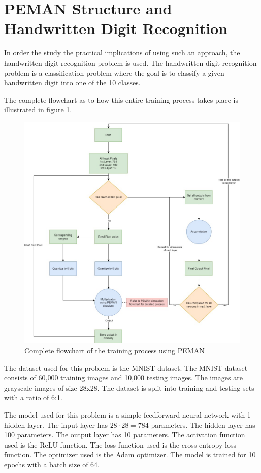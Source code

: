 \section{PEMAN Structure and Handwritten Digit Recognition}

In order the study the practical implications of using such an approach, the handwritten digit recognition problem is used. The handwritten digit recognition problem is a classification problem where the goal is to classify a given handwritten digit into one of the 10 classes.

The complete flowchart as to how this entire training process takes place is illustrated in figure \ref{compFLowchart}.

\begin{figure}
	\centering
	\includegraphics[width=\textwidth]{images/compFLowchart.png}
	\caption{Complete flowchart of the training process using PEMAN}
	\label{compFLowchart}
\end{figure}

The dataset used for this problem is the MNIST dataset. The MNIST dataset consists of 60,000 training images and 10,000 testing images. The images are grayscale images of size 28x28. The dataset is split into training and testing sets with a ratio of 6:1.

The model used for this problem is a simple feedforward neural network with 1 hidden layer. The input layer has $28 \cdot 28 = 784$ parameters. The hidden layer has 100 parameters. The output layer has 10 parameters. The activation function used is the ReLU function. The loss function used is the cross entropy loss function. The optimizer used is the Adam optimizer. The model is trained for 10 epochs with a batch size of 64.


